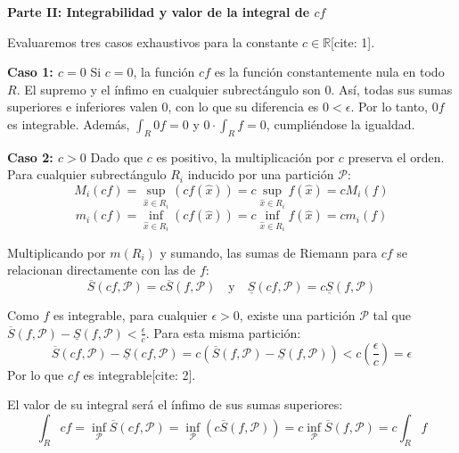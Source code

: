 \documentclass[11pt,letterpaper]{article}
\begin{document}
\vspace{0.5cm}
\textbf{Parte II: Integrabilidad y valor de la integral de $cf$}

Evaluaremos tres casos exhaustivos para la constante $c \in \mathbb{R}$[cite: 1].

\textbf{Caso 1: $c = 0$}
Si $c=0$, la función $cf$ es la función constantemente nula en todo $R$. El supremo y el ínfimo en cualquier subrectángulo son $0$. Así, todas sus sumas superiores e inferiores valen $0$, con lo que su diferencia es $0 < \epsilon$. Por lo tanto, $0f$ es integrable. Además, $\int_{R} 0f = 0$ y $0 \cdot \int_{R} f = 0$, cumpliéndose la igualdad.

\textbf{Caso 2: $c > 0$}
Dado que $c$ es positivo, la multiplicación por $c$ preserva el orden. Para cualquier subrectángulo $R_{i}$ inducido por una partición $\mathcal{P}$:
\begin{equation*}
M_{i}(cf) = \sup_{\hat{x} \in R_{i}} (c f(\hat{x})) = c \sup_{\hat{x} \in R_{i}} f(\hat{x}) = c M_{i}(f)
\end{equation*}
\begin{equation*}
m_{i}(cf) = \inf_{\hat{x} \in R_{i}} (c f(\hat{x})) = c \inf_{\hat{x} \in R_{i}} f(\hat{x}) = c m_{i}(f)
\end{equation*}

Multiplicando por $m(R_{i})$ y sumando, las sumas de Riemann para $cf$ se relacionan directamente con las de $f$:
\begin{equation*}
\overline{S}(cf,\mathcal{P}) = c \overline{S}(f,\mathcal{P}) \quad \text{y} \quad \underline{S}(cf,\mathcal{P}) = c \underline{S}(f,\mathcal{P})
\end{equation*}

Como $f$ es integrable, para cualquier $\epsilon > 0$, existe una partición $\mathcal{P}$ tal que $\overline{S}(f,\mathcal{P}) - \underline{S}(f,\mathcal{P}) < \frac{\epsilon}{c}$. Para esta misma partición:
\begin{equation*}
\overline{S}(cf,\mathcal{P}) - \underline{S}(cf,\mathcal{P}) = c(\overline{S}(f,\mathcal{P}) - \underline{S}(f,\mathcal{P})) < c \left(\frac{\epsilon}{c}\right) = \epsilon
\end{equation*}
Por lo que $cf$ es integrable[cite: 2].

El valor de su integral será el ínfimo de sus sumas superiores:
\begin{equation*}
\int_{R}cf = \inf_{\mathcal{P}} \overline{S}(cf,\mathcal{P}) = \inf_{\mathcal{P}} (c \overline{S}(f,\mathcal{P})) = c \inf_{\mathcal{P}} \overline{S}(f,\mathcal{P}) = c \int_{R}f
\end{equation*}
\end{document}
